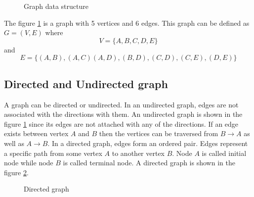 \documentclass[a4paper,11pt]{book}
\begin{document}
\begin{figure}
    \centering
    \caption{Graph data structure}
    \label{fig:graph}
\end{figure}

\noindent The figure \ref{fig:graph} is a graph with 5 vertices and 6 edges. This graph can be defined as $G = ( V , E )$ where $$V = \{A,B,C,D,E\}$$ and $$E = \{(A,B),(A,C)(A,D),(B,D),(C,D),(C,E),(D,E)\}$$

\subsection{Directed and Undirected graph}

\noindent A graph can be directed or undirected. In an undirected graph, edges are not associated with the directions with them. An undirected graph is shown in the figure \ref{fig:graph} since its edges are not attached with any of the directions. If an edge exists between vertex $A$ and $B$ then the vertices can be traversed from $B \rightarrow A$ as well as $A \rightarrow B$. In a directed graph, edges form an ordered pair. Edges represent a specific path from some vertex $A$ to another vertex $B$. Node $A$ is called initial node while node $B$ is called terminal node. A directed graph is shown in the figure \ref{fig:graph2}.
\begin{figure}
    \centering
    \caption{Directed graph}
    \label{fig:graph2}
\end{figure}
\end{document}
